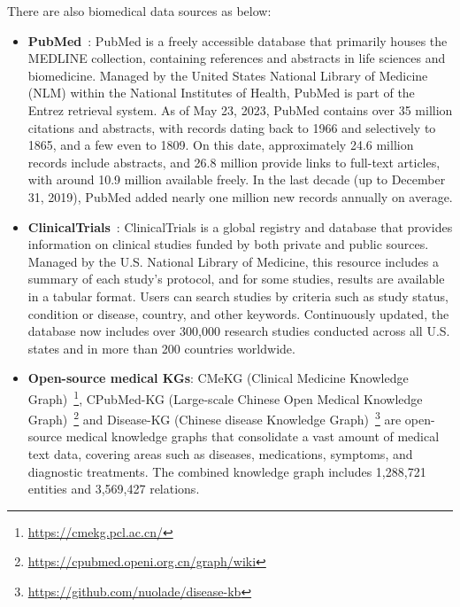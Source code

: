There are also biomedical data sources as below:
\begin{itemize}[leftmargin=*]
    \item \textbf{PubMed}~\cite{lu2011pubmed}: PubMed is a freely accessible database that primarily houses the MEDLINE collection, containing references and abstracts in life sciences and biomedicine. Managed by the United States National Library of Medicine (NLM) within the National Institutes of Health, PubMed is part of the Entrez retrieval system. As of May 23, 2023, PubMed contains over 35 million citations and abstracts, with records dating back to 1966 and selectively to 1865, and a few even to 1809. On this date, approximately 24.6 million records include abstracts, and 26.8 million provide links to full-text articles, with around 10.9 million available freely. In the last decade (up to December 31, 2019), PubMed added nearly one million new records annually on average.
    
    \item \textbf{ClinicalTrials}~\cite{zarin2011clinicaltrials}: ClinicalTrials is a global registry and database that provides information on clinical studies funded by both private and public sources. Managed by the U.S. National Library of Medicine, this resource includes a summary of each study's protocol, and for some studies, results are available in a tabular format. Users can search studies by criteria such as study status, condition or disease, country, and other keywords. Continuously updated, the database now includes over 300,000 research studies conducted across all U.S. states and in more than 200 countries worldwide.

    \item  \textbf{Open-source medical KGs}: CMeKG (Clinical Medicine Knowledge Graph)~\footnote{\href{https://cmekg.pcl.ac.cn/}{https://cmekg.pcl.ac.cn/}}, CPubMed-KG (Large-scale Chinese Open Medical  Knowledge Graph)~\footnote{\href{https://cpubmed.openi.org.cn/graph/wiki}{https://cpubmed.openi.org.cn/graph/wiki}} and Disease-KG (Chinese disease Knowledge Graph)~\footnote{\href{https://github.com/nuolade/disease-kb}{https://github.com/nuolade/disease-kb}} are open-source medical knowledge graphs that consolidate a vast amount of medical text data, covering areas such as diseases, medications, symptoms, and diagnostic treatments. The combined knowledge graph includes 1,288,721 entities and 3,569,427 relations.
\end{itemize}

